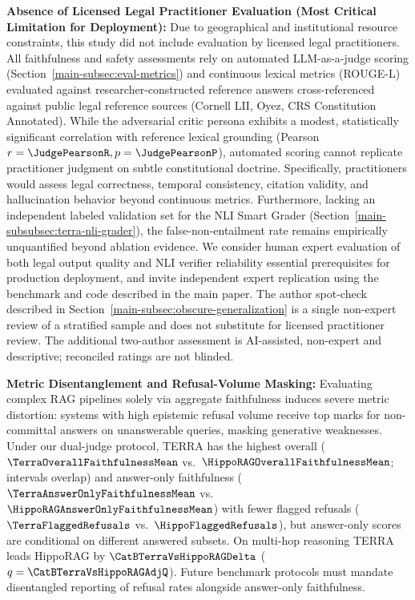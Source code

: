 \item \textbf{Absence of Licensed Legal Practitioner Evaluation (Most Critical Limitation for Deployment):} Due to geographical and institutional resource constraints, this study did not include evaluation by licensed legal practitioners. All faithfulness and safety assessments rely on automated LLM-as-a-judge scoring (Section~\ref{main-subsec:eval-metrics}) and continuous lexical metrics (ROUGE-L) evaluated against researcher-constructed reference answers cross-referenced against public legal reference sources (Cornell LII, Oyez, CRS Constitution Annotated). While the adversarial critic persona exhibits a modest, statistically significant correlation with reference lexical grounding (Pearson $r = \JudgePearsonR, p = \JudgePearsonP$), automated scoring cannot replicate practitioner judgment on subtle constitutional doctrine. Specifically, practitioners would assess legal correctness, temporal consistency, citation validity, and hallucination behavior beyond continuous metrics. Furthermore, lacking an independent labeled validation set for the NLI Smart Grader (Section~\ref{main-subsubsec:terra-nli-grader}), the false-non-entailment rate remains empirically unquantified beyond ablation evidence. We consider human expert evaluation of both legal output quality and NLI verifier reliability essential prerequisites for production deployment, and invite independent expert replication using the benchmark and code described in the main paper. The author spot-check described in Section~\ref{main-subsec:obscure-generalization} is a single non-expert review of a stratified sample and does not substitute for licensed practitioner review. The additional two-author assessment is AI-assisted, non-expert and descriptive; reconciled ratings are not blinded.

\item \textbf{Metric Disentanglement and Refusal-Volume Masking:} Evaluating complex RAG pipelines solely via aggregate faithfulness induces severe metric distortion: systems with high epistemic refusal volume receive top marks for non-committal answers on unanswerable queries, masking generative weaknesses. Under our dual-judge protocol, TERRA has the highest overall ($\TerraOverallFaithfulnessMean$ vs.\ $\HippoRAGOverallFaithfulnessMean$; intervals overlap) and answer-only faithfulness ($\TerraAnswerOnlyFaithfulnessMean$ vs.\ $\HippoRAGAnswerOnlyFaithfulnessMean$) with fewer flagged refusals ($\TerraFlaggedRefusals$ vs.\ $\HippoFlaggedRefusals$), but answer-only scores are conditional on different answered subsets. On multi-hop reasoning TERRA leads HippoRAG by $\CatBTerraVsHippoRAGDelta$ ($q=\CatBTerraVsHippoRAGAdjQ$). Future benchmark protocols must mandate disentangled reporting of refusal rates alongside answer-only faithfulness.

